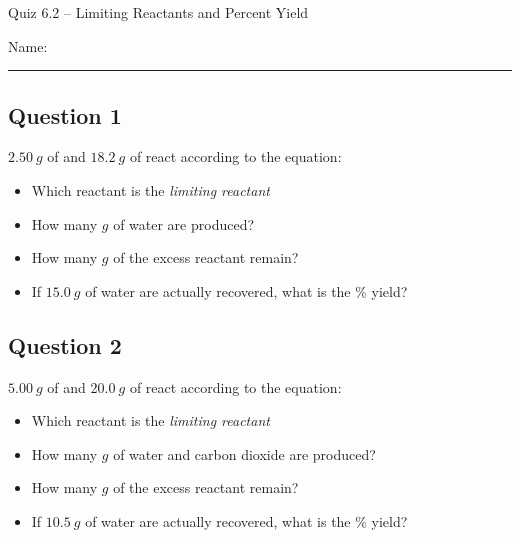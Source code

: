 \documentclass[11pt, letterpaper]{memoir}
\begin{document}
	\begin{center}
		{\large Quiz 6.2 --	Limiting Reactants and Percent Yield}
	\end{center}
	{\large Name: \rule[-1mm]{4in}{.1pt} 

\subsection*{Question 1}
$2.50~g$ of  and $18.2~g$ of  react according to the equation: 

\noindent
\begin{itemize}
	\item Which reactant is the \emph{limiting reactant}
	
	\vspace{3em}
	\item How many $g$ of water are produced?
	
	\vspace{3em}
	\item How many $g$ of the excess reactant remain?
	
	\vspace{3em}
	\item If $15.0~g$ of water are actually recovered, what is the \% yield?
\end{itemize}

\vspace{3em}
\subsection*{Question 2}
$5.00~g$ of  and $20.0~g$ of  react according to the equation: 

\noindent
\begin{itemize}
	\item Which reactant is the \emph{limiting reactant}
	
	\vspace{3em}
	\item How many $g$ of water and carbon dioxide are produced?
	
	\vspace{6em}
	\item How many $g$ of the excess reactant remain?
	
	\vspace{3em}
	\item If $10.5~g$ of water are actually recovered, what is the \% yield?
\end{itemize}

}
\end{document}
